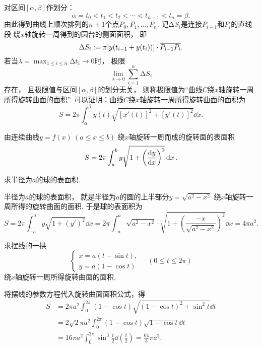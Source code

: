 对区间\([\alpha,\beta]\)作划分：\[
	\alpha = t_0 < t_1 < t_2 < \dotsb < t_{n-1} < t_n = \beta.
\]
由此得到曲线上顺次排列的\(n+1\)个点\(P_0,P_1,\dotsc,P_n\).
记\(\increment S_i\)是连接\(P_{i-1}\)和\(P_i\)的直线段
绕\(x\)轴旋转一周得到的圆台的侧面面积，
即\[
	\Delta S_i
	:=
	\pi [y(t_{i-1} + y(t_i))] \cdot \overline{P_{i-1} P_i}.
\]
若当\(\lambda=\max_{1 \leq i \leq n} \increment t_i \to 0\)时，
极限\[
	\lim_{\lambda\to0} \sum_{i=1}^n \increment S_i
\]存在，
且极限值与区间\([\alpha,\beta]\)的划分无关，
则称极限值为“曲线\(C\)绕\(x\)轴旋转一周所得旋转曲面的面积”.
可以证明：曲线\(C\)绕\(x\)轴旋转一周所得旋转曲面的面积为\begin{equation}
	S = 2\pi \int_\alpha^\beta y(t) \sqrt{[x'(t)]^2 + [y'(t)]^2} \dd{x}.
\end{equation}

\begin{theorem}[古尔丁表面积定理]
由连续曲线\(y=f(x)\ (a \leq x \leq b)\)
绕\(x\)轴旋转一周而成的旋转面的表面积\begin{equation}
	S = 2\pi \int_a^b y \sqrt{1+\left(\dv{y}{x}\right)^2} \dd{x}.
\end{equation}
\end{theorem}

\begin{example}
求半径为\(a\)的球的表面积.
\begin{solution}
半径为\(a\)的球的表面积，
就是半径为\(a\)的圆的上半部分\(y=\sqrt{a^2-x^2}\)
绕\(x\)轴旋转一周所得的旋转曲面的面积.
于是球的表面积为\[
	S = 2\pi \int_{-a}^a y \sqrt{1+(y')^2} \dd{x}
	= 2\pi \int_{-a}^a \sqrt{a^2-x^2} \cdot
		\sqrt{1+\left(\frac{-x}{\sqrt{a^2-x^2}}\right)^2} \dd{x}
	= 4\pi a^2.
\]
\end{solution}
\end{example}

\begin{example}
求摆线的一拱\[
	\left\{ \begin{array}{l}
		x = a (t - \sin t), \\
		y = a (1 - \cos t)
	\end{array} \right.
	\quad(0 \leq t \leq 2\pi)
\]绕\(x\)轴旋转一周所得旋转曲面的面积.
\begin{solution}
将摆线的参数方程代入旋转曲面面积公式，得\begin{align*}
	S &= 2\pi a^2 \int_0^{2\pi} (1-\cos t) \sqrt{(1-\cos t)^2 + \sin^2 t} \dd{t} \\
	&= 2\sqrt2 \pi a^2 \int_0^{2\pi} (1-\cos t) \sqrt{1-\cos t} \dd{t} \\
	&= 16\pi a^2 \int_0^{2\pi} \sin^3 \frac{t}{2} \dd(\frac{t}{2})
	= \frac{64}3 \pi a^2.
\end{align*}
\end{solution}
\end{example}

